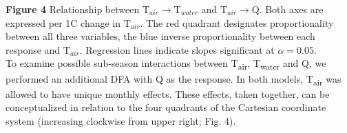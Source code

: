 \documentclass[notitlepage]{article}
\begin{document}
\begin{center}
\end{center}
\textbf{Figure 4} Relationship between $\textrm{T}_{air}\rightarrow \textrm{T}_{water}$ and $\textrm{T}_{air}\rightarrow \textrm{Q}$. Both axes are expressed per 1\degree C change in $\textrm{T}_{air}$. The red quadrant designates proportionality between all three variables, the blue inverse proportionality between each response and $\textrm{T}_{air}$. Regression lines indicate slopes significant at $\alpha=0.05$.
\\[\baselineskip]

To examine possible sub-season interactions between T\textsubscript{air}, T\textsubscript{water} and Q, we performed an additional DFA with Q as the response. In both models, T\textsubscript{air} was allowed to have unique monthly effects. These effects, taken together, can be conceptualized in relation to the four quadrants of the Cartesian coordinate system (increasing clockwise from upper right; Fig. 4).
\end{document}
